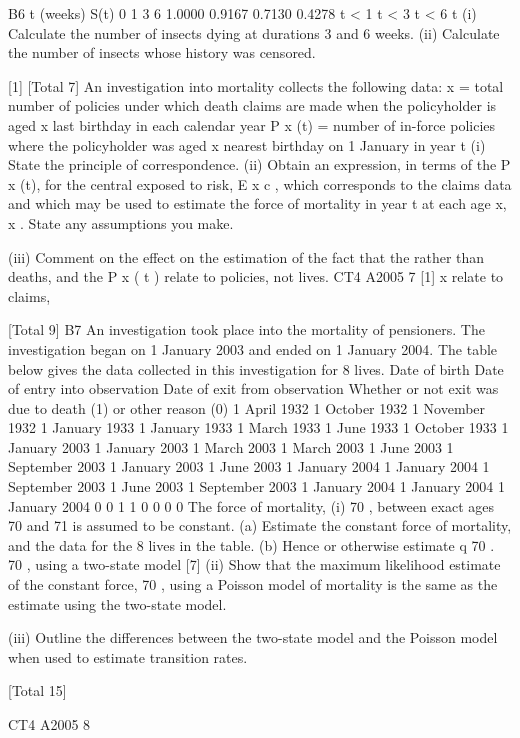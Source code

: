 \documentclass[a4paper,12pt]{article}
\begin{document}
\begin{enumerate}
B6
t (weeks) S(t)
0
1
3
6 1.0000
0.9167
0.7130
0.4278
t < 1
t < 3
t < 6
t
(i) Calculate the number of insects dying at durations 3 and 6 weeks.
(ii) Calculate the number of insects whose history was censored.

[1]
[Total 7]
An investigation into mortality collects the following data:
x
= total number of policies under which death claims are made when the
policyholder is aged x last birthday in each calendar year
P x (t) = number of in-force policies where the policyholder was aged x nearest
birthday on 1 January in year t
(i) State the principle of correspondence.
(ii) Obtain an expression, in terms of the P x (t), for the central exposed to risk, E x c ,
which corresponds to the claims data and which may be used to estimate the
force of mortality in year t at each age x, x . State any assumptions you
make.

(iii) Comment on the effect on the estimation of the fact that the
rather than deaths, and the P x ( t ) relate to policies, not lives.
CT4 A2005
7
[1]
x
relate to claims,

[Total 9]
B7
An investigation took place into the mortality of pensioners. The investigation began
on 1 January 2003 and ended on 1 January 2004. The table below gives the data
collected in this investigation for 8 lives.
Date of birth Date of entry
into observation Date of exit from
observation Whether
or not exit was
due to death (1)
or other
reason (0)
1 April 1932
1 October 1932
1 November 1932
1 January 1933
1 January 1933
1 March 1933
1 June 1933
1 October 1933 1 January 2003
1 January 2003
1 March 2003
1 March 2003
1 June 2003
1 September 2003
1 January 2003
1 June 2003 1 January 2004
1 January 2004
1 September 2003
1 June 2003
1 September 2003
1 January 2004
1 January 2004
1 January 2004 0
0
1
1
0
0
0
0
The force of mortality,
(i)
70 ,
between exact ages 70 and 71 is assumed to be constant.
(a) Estimate the constant force of mortality,
and the data for the 8 lives in the table.
(b) Hence or otherwise estimate q 70 .
70 ,
using a two-state model
[7]
(ii) Show that the maximum likelihood estimate of the constant force, 70 , using a
Poisson model of mortality is the same as the estimate using the two-state
model.

(iii) Outline the differences between the two-state model and the Poisson model
when used to estimate transition rates.

[Total 15]

CT4 A2005
8


\end{enumerate}
\end{document}
